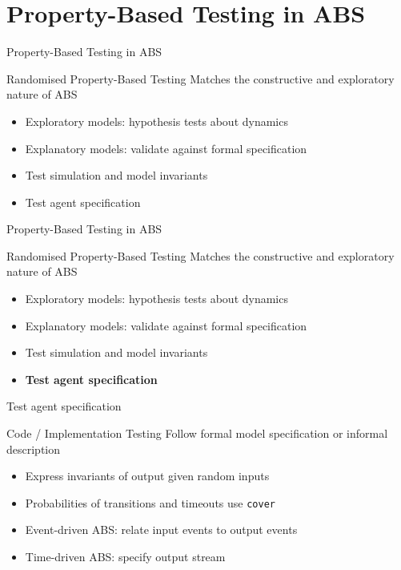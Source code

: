 \documentclass{beamer} %
\begin{document}
\section{Property-Based Testing in ABS}
\begin{frame}{Property-Based Testing in ABS}
\begin{block}{Randomised Property-Based Testing}
Matches the constructive and exploratory nature of ABS
\end{block}

  \begin{itemize}
    \item Exploratory models: hypothesis tests about dynamics
    \item Explanatory models: validate against formal specification
    \item Test simulation and model invariants
    \item Test agent specification
  \end{itemize}
\end{frame}

\begin{frame}{Property-Based Testing in ABS}
\begin{block}{Randomised Property-Based Testing}
Matches the constructive and exploratory nature of ABS
\end{block}

  \begin{itemize}
    \item Exploratory models: hypothesis tests about dynamics
    \item Explanatory models: validate against formal specification
    \item Test simulation and model invariants
    \item \textbf{Test agent specification}
  \end{itemize}
\end{frame}

\begin{frame}{Test agent specification}
\begin{block}{Code / Implementation Testing}
Follow formal model specification or informal description
\end{block}

\begin{block}{}
  \begin{itemize}
  	\item Express invariants of output given random inputs
  	\item Probabilities of transitions and timeouts use \texttt{cover}
    \item Event-driven ABS: relate input events to output events 
    \item Time-driven ABS: specify output stream
  \end{itemize}
\end{block}
\end{frame}
\end{document}
